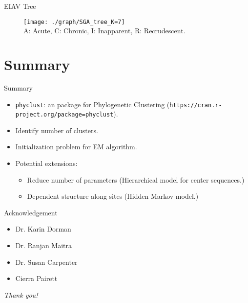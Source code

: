 \documentclass{beamer}
\begin{document}

\begin{frame}{EIAV Tree}

\begin{center}
\vspace{-0.5cm}
\begin{figure}
\hspace{-1.0cm}
  \texttt{[image: ./graph/SGA\_tree\_K=7]}
  \\
  \vspace{-0.5cm}
  {\tiny A: Acute, C: Chronic, I: Inapparent, R: Recrudescent.}
\end{figure}
\end{center}

\end{frame}


\section{Summary}

\begin{frame}{Summary}

\begin{itemize}
\item {\tt phyclust}: an \R package for Phylogenetic Clustering
      ({\tt https://cran.r-project.org/package=phyclust}).
\item Identify number of clusters.
\item Initialization problem for EM algorithm.
\item Potential extensions:
\begin{itemize}
\item Reduce number of parameters (Hierarchical model for center sequences.)
\item Dependent structure along sites (Hidden Markov model.)
\end{itemize}
\end{itemize}

\end{frame}


\begin{frame}{Acknowledgement}

\begin{itemize}
\item Dr. Karin Dorman
\item Dr. Ranjan Maitra
\item Dr. Susan Carpenter
\item Cierra Pairett
\end{itemize}

\vspace{2.5cm}
\Huge
\centering
\color{dgreen}
{\it Thank you!}

\end{frame}
\end{document}

